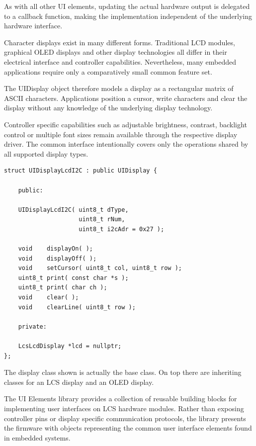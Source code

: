 As with all other UI elements, updating the actual hardware output is delegated
to a callback function, making the implementation independent of the underlying
hardware interface.


Character displays exist in many different forms. Traditional LCD modules,
graphical OLED displays and other display technologies all differ in their
electrical interface and controller capabilities. Nevertheless, many embedded
applications require only a comparatively small common feature set.

The UIDisplay object therefore models a display as a rectangular matrix of ASCII
characters. Applications position a cursor, write characters and clear the
display without any knowledge of the underlying display technology.

Controller specific capabilities such as adjustable brightness, contrast,
backlight control or multiple font sizes remain available through the respective
display driver. The common interface intentionally covers only the operations
shared by all supported display types.

\lstset{language=c++, style=codesnippetstyle, numbers=none}
\begin{lstlisting}
struct UIDisplayLcdI2C : public UIDisplay {

    public:

    UIDisplayLcdI2C( uint8_t dType, 
                     uint8_t rNum, 
                     uint8_t i2cAdr = 0x27 );

    void    displayOn( );
    void    displayOff( );
    void    setCursor( uint8_t col, uint8_t row );
    uint8_t print( const char *s );
    uint8_t print( char ch );
    void    clear( );
    void    clearLine( uint8_t row );

    private: 

    LcsLcdDisplay *lcd = nullptr;
};\end{lstlisting}
\FloatBarrier

The display class shown is actually the base class. On top there are inheriting 
classes for an LCS display and an OLED display. 


The UI Elements library provides a collection of reusable building blocks for
implementing user interfaces on LCS hardware modules. Rather than exposing
controller pins or display specific communication protocols, the library
presents the firmware with objects representing the common user interface
elements found in embedded systems.

